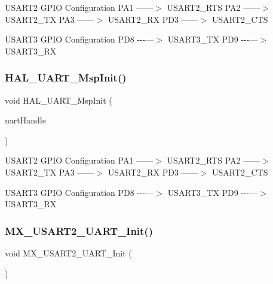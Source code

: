 U\+S\+A\+R\+T2 G\+P\+IO Configuration P\+A1 ------$>$ U\+S\+A\+R\+T2\+\_\+\+R\+TS P\+A2 ------$>$ U\+S\+A\+R\+T2\+\_\+\+TX P\+A3 ------$>$ U\+S\+A\+R\+T2\+\_\+\+RX P\+D3 ------$>$ U\+S\+A\+R\+T2\+\_\+\+C\+TS

U\+S\+A\+R\+T3 G\+P\+IO Configuration P\+D8 -\/-\/-\/---$>$ U\+S\+A\+R\+T3\+\_\+\+TX P\+D9 -\/-\/-\/---$>$ U\+S\+A\+R\+T3\+\_\+\+RX\mbox{\label{usart_8c_a62a25476866998c7aadfb5c0864fa349}} 
\subsubsection{H\+A\+L\+\_\+\+U\+A\+R\+T\+\_\+\+Msp\+Init()}
{\footnotesize\ttfamily void H\+A\+L\+\_\+\+U\+A\+R\+T\+\_\+\+Msp\+Init (\begin{DoxyParamCaption}\item[{U\+A\+R\+T\+\_\+\+Handle\+Type\+Def $\ast$}]{uart\+Handle }\end{DoxyParamCaption})}

U\+S\+A\+R\+T2 G\+P\+IO Configuration P\+A1 ------$>$ U\+S\+A\+R\+T2\+\_\+\+R\+TS P\+A2 ------$>$ U\+S\+A\+R\+T2\+\_\+\+TX P\+A3 ------$>$ U\+S\+A\+R\+T2\+\_\+\+RX P\+D3 ------$>$ U\+S\+A\+R\+T2\+\_\+\+C\+TS

U\+S\+A\+R\+T3 G\+P\+IO Configuration P\+D8 -\/-\/-\/---$>$ U\+S\+A\+R\+T3\+\_\+\+TX P\+D9 -\/-\/-\/---$>$ U\+S\+A\+R\+T3\+\_\+\+RX\mbox{\label{usart_8c_a052088fe5bb3f807a4b2502e664fd4fd}} 
\subsubsection{M\+X\+\_\+\+U\+S\+A\+R\+T2\+\_\+\+U\+A\+R\+T\+\_\+\+Init()}
{\footnotesize\ttfamily void M\+X\+\_\+\+U\+S\+A\+R\+T2\+\_\+\+U\+A\+R\+T\+\_\+\+Init (\begin{DoxyParamCaption}\item[{void}]{ }\end{DoxyParamCaption})}

\mbox{\label{usart_8c_a3d04b903a77089f6ce08dd0bf1c81a81}} 
